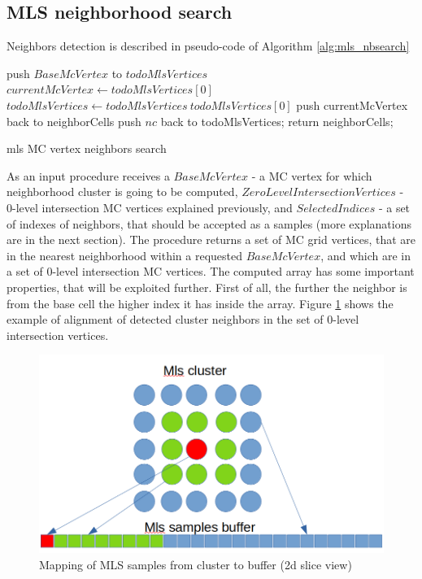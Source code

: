 \subsection{MLS neighborhood search}
Neighbors detection is described in pseudo-code of Algorithm \ref{alg:mls_nbsearch}
\begin{algorithm}[H]
	\scriptsize
	\begin{algorithmic}
		\State push $BaseMcVertex$ to $todoMlsVertices$
			\State $currentMcVertex \gets todoMlsVertices[0]$
			\State $todoMlsVertices \gets todoMlsVertices \ todoMlsVertices[0]$
				\State push currentMcVertex back to neighborCells
			\EndIf
					\State push $nc$ back to todoMlsVertices;
				\EndIf
			\EndFor
		\EndWhile
		return neighborCells;
	\end{algorithmic}
	\caption{mls MC vertex neighbors search}
	\label{alg:mls_nbsearch}
\end{algorithm}
As an input procedure receives a $BaseMcVertex$ - a MC vertex for which neighborhood cluster is going to be computed, $ZeroLevelIntersectionVertices$ - 0-level intersection MC vertices explained previously, and $SelectedIndices$ - a set of indexes of neighbors, that should be accepted as a samples (more explanations are in the next section). The procedure returns a set of MC grid vertices, that are in the nearest neighborhood within a requested $BaseMcVertex$, and which are in a set of 0-level intersection MC vertices. The computed array has some important properties, that will be exploited further. First of all, the further the neighbor is from the base cell the higher index it has inside the array. Figure \ref{fig:mls_neighbor_alignment} shows the example of alignment of detected cluster neighbors in the set of 0-level intersection vertices.\\
\begin{figure}[H]
	\begin{center}
		\includegraphics[width=\textwidth]{figures/MlsSamplesBufferAlignment.png}
	\end{center}
	\caption{Mapping of MLS samples from cluster to buffer (2d slice view)} \label{fig:mls_neighbor_alignment}
\end{figure}
